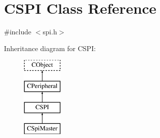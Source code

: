 \hypertarget{class_c_s_p_i}{\section{C\-S\-P\-I Class Reference}
\label{class_c_s_p_i}
}


{\ttfamily \#include $<$spi.\-h$>$}

Inheritance diagram for C\-S\-P\-I\-:\begin{figure}[H]
\begin{center}
\leavevmode
\includegraphics[height=4.000000cm]{d2/d3f/class_c_s_p_i}
\end{center}
\end{figure}
